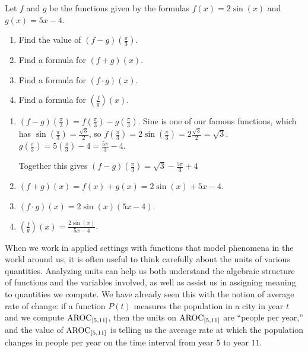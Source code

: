 \documentclass{ximera}
\begin{document}
	\begin{example}
		Let $f$ and $g$ be the functions given by the formulas $f(x) = 2\sin(x)$ and $g(x)=5x-4$.
		\begin{enumerate}
			\item Find the value of $( f - g)\left( \frac{\pi}{3} \right)$.\\
			\item Find a formula for $( f + g)(x)$.\\
			\item Find a formula for $( f \cdot g)(x)$.\\
			\item Find a formula for $\left( \frac{f}{g}\right)(x)$.\\
		\end{enumerate}
		\begin{explanation}
			\begin{enumerate}
				\item $(f-g)\left( \frac{\pi}{3} \right) = f\left( \frac{\pi}{3} \right)-g\left( \frac{\pi}{3} \right)$.
					Sine is one of our famous functions, which has $\sin\left( \frac{\pi}{3} \right) = \frac{\sqrt{3}}{2}$, so 
					$f\left( \frac{\pi}{3} \right) = 2 \sin\left( \frac{\pi}{3} \right) = 2 \frac{\sqrt{3}}{2} = \sqrt{3}$.
					$g\left( \frac{\pi}{3} \right) = 5\left( \frac{\pi}{3} \right)-4 = \frac{5\pi}{3}-4$.
					
					Together this gives $(f-g)\left( \frac{\pi}{3} \right) = \sqrt{3} - \frac{5\pi}{3}+4$
				
				\item $( f + g)(x) = f(x) + g(x) = 2\sin(x) + 5x - 4$.\\
					
				\item $( f \cdot g)(x) = 2\sin(x)\left(5x-4\right)$.\\

				\item $\left( \frac{f}{g}\right)(x) = \frac{2\sin(x)}{5x-4}$.\\
			\end{enumerate}
		\end{explanation}
	\end{example}
	
	

	
	When we work in applied settings with functions that model phenomena in the world around us, it is often useful to think carefully about the units of 
	various quantities. Analyzing units can help us both understand the algebraic structure of functions and the variables involved, as well as assist us in 
	assigning meaning to quantities we compute. We have already seen this with the notion of average rate of change: if a function $P(t)$ measures the 
	population in a city in year $t$ and we compute $\mathrm{AROC}_{[5, 11]}$, then the units on $\mathrm{AROC}_{[5, 11]}$ are ``people per year,'' and the value of 
	$\mathrm{AROC}_{[5, 11]}$ is telling us the average rate at which the population changes in people per year on the time interval from year $5$ to year $11$.
\end{document}
